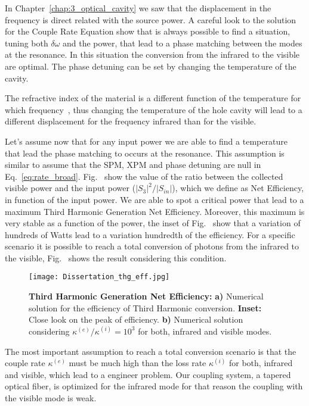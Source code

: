 In Chapter~\ref{chap:3_optical_cavity} we saw that the displacement in the frequency is direct related with the source power. A careful look to the solution for the Couple Rate Equation show that is always possible to find a situation, tuning both $\delta\omega$ and the power, that lead to a phase matching between the modes at the resonance. In this situation the conversion from the infrared to the visible are optimal. The phase detuning can be set by changing the temperature of the cavity. 

The refractive index of the material is a different function of the temperature for which frequency~\cite{Toyoda1983, Klocek}, thus changing the temperature of the hole cavity will lead to a different displacement for the frequency infrared than for the visible. 

Let's assume now that for any input power we are able to find a temperature that lead the phase matching to occurs at the resonance. This assumption is similar to assume that the SPM, XPM and phase detuning are null in Eq.~\ref{eq:rate_broad}. Fig.~
show the value of the ratio between the collected visible power and the input power ($|S_3|^2/|S_{in}|$), which we define as Net Efficiency, in function of the input power. We are able to spot a critical power that lead to a maximum Third Harmonic Generation Net Efficiency. Moreover, this maximum is very stable as a function of the power, the inset of Fig.~ show that a variation of hundreds of Watts lead to a variation hundredth of the efficiency. For a specific scenario it is possible to reach a total conversion of photons from the infrared to the visible, Fig.~ shows the result considering this condition. 

\begin{figure}[h]
    \centering
    \texttt{[image: Dissertation\_thg\_eff.jpg]}
    \caption{\textbf{Third Harmonic Generation Net Efficiency:} \textbf{a)} Numerical solution for the efficiency of Third Harmonic conversion. \textbf{Inset:} Close look on the peak of efficiency. \textbf{b)} Numerical solution considering $\kappa^{(e)}/\kappa^{(i)} = 10^3$ for both, infrared and visible modes.}
    \label{fig:power_solution}
\end{figure}

The most important assumption to reach a total conversion scenario is that the couple rate $\kappa^{(e)}$ must be much high than the loss rate $\kappa^{(i)}$ for both, infrared and visible, which lead to a engineer problem. Our coupling system, a tapered optical fiber, is optimized for the infrared mode for that reason the coupling with the visible mode is weak.

